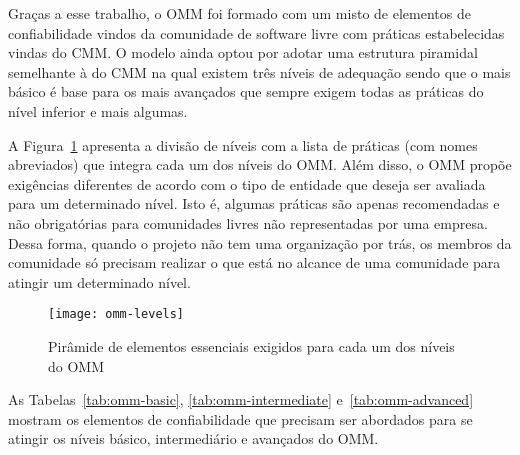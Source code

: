 Graças a esse trabalho, o OMM foi formado com um misto de elementos de
confiabilidade vindos da comunidade de software livre com práticas
estabelecidas vindas do CMM. O modelo ainda optou por adotar uma
estrutura piramidal semelhante à do CMM na qual existem três níveis de
adequação sendo que o mais básico é base para os mais avançados que
sempre exigem todas as práticas do nível inferior e mais algumas.

A Figura~\ref{fig:piramide-omm} apresenta a divisão de níveis com a
lista de práticas (com nomes abreviados) que integra cada um dos
níveis do OMM. Além disso, o OMM propõe exigências diferentes de
acordo com o tipo de entidade que deseja ser avaliada para um
determinado nível. Isto é, algumas práticas são apenas recomendadas e
não obrigatórias para comunidades livres não representadas por uma
empresa. Dessa forma, quando o projeto não tem uma organização por
trás, os membros da comunidade só precisam realizar o que está no
alcance de uma comunidade para atingir um determinado nível.

\begin{figure}
  \centering
  \texttt{[image: omm-levels]}
  \caption{Pirâmide de elementos essenciais exigidos para cada um dos
    níveis do OMM}
  \label{fig:piramide-omm}
\end{figure}

As Tabelas~\ref{tab:omm-basic}, \ref{tab:omm-intermediate}
e~\ref{tab:omm-advanced} mostram os elementos de confiabilidade que
precisam ser abordados para se atingir os níveis básico, intermediário
e avançados do OMM.


